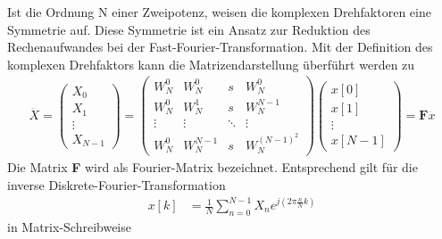 Ist die Ordnung N einer Zweipotenz, weisen die komplexen Drehfaktoren eine Symmetrie auf. Diese Symmetrie ist ein Ansatz zur Reduktion des Rechenaufwandes bei der Fast-Fourier-Transformation. Mit der Definition des komplexen Drehfaktors kann die Matrizendarstellung überführt werden zu
\begin{align}
\overset{\underbar{}}{X} = \begin{pmatrix}
X_{0} \\
X_{1} \\
 \vdots \\
X_{N - 1}
\end{pmatrix} = \begin{pmatrix}
W_{N}^{0} & W_{N}^{0} & s & W_{N}^{0} \\
W_{N}^{0} & W_{N}^{1} & s & W_{N}^{N - 1} \\
 \vdots & \vdots & \ddots & \vdots \\
W_{N}^{0} & W_{N}^{N - 1} & s & W_{N}^{(N - 1)^{2}}
\end{pmatrix}  \begin{pmatrix}
x[ 0] \\
x[ 1] \\
 \vdots \\
x[ N - 1]
\end{pmatrix} = \mathbf{F}  \overset{\underbar{}}{x} \label{eq:10.86}
\end{align}
Die Matrix \textbf{F} wird als Fourier-Matrix bezeichnet. Entsprechend gilt für die inverse Diskrete-Fourier-Transformation
\begin{align}
x[ k] &= \frac{1}{N}  \sum\limits_{n = 0}^{N - 1}X_{n}  e^{j  \left( 2  \pi  \frac{n}{N}  k \right)} \label{eq:10.87}
\end{align}
in Matrix-Schreibweise
